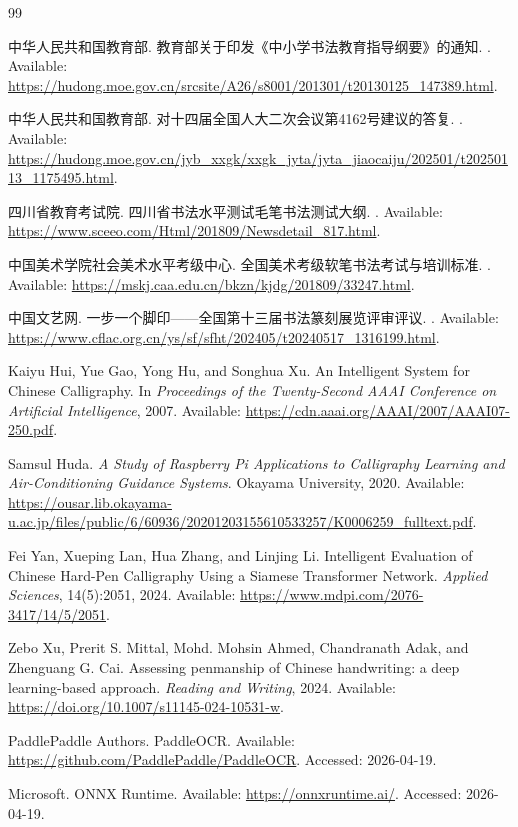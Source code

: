 \documentclass[UTF8,a4paper,12pt,fontset=none]{ctexart}
\begin{document}
\begin{thebibliography}{99}

中华人民共和国教育部.
\newblock 教育部关于印发《中小学书法教育指导纲要》的通知.
.
\newblock Available: \url{https://hudong.moe.gov.cn/srcsite/A26/s8001/201301/t20130125_147389.html}.

中华人民共和国教育部.
\newblock 对十四届全国人大二次会议第4162号建议的答复.
.
\newblock Available: \url{https://hudong.moe.gov.cn/jyb_xxgk/xxgk_jyta/jyta_jiaocaiju/202501/t20250113_1175495.html}.

四川省教育考试院.
\newblock 四川省书法水平测试毛笔书法测试大纲.
.
\newblock Available: \url{https://www.sceeo.com/Html/201809/Newsdetail_817.html}.

中国美术学院社会美术水平考级中心.
\newblock 全国美术考级软笔书法考试与培训标准.
.
\newblock Available: \url{https://mskj.caa.edu.cn/bkzn/kjdg/201809/33247.html}.

中国文艺网.
\newblock 一步一个脚印——全国第十三届书法篆刻展览评审评议.
.
\newblock Available: \url{https://www.cflac.org.cn/ys/sf/sfht/202405/t20240517_1316199.html}.

Kaiyu Hui, Yue Gao, Yong Hu, and Songhua Xu.
\newblock An Intelligent System for Chinese Calligraphy.
\newblock In \emph{Proceedings of the Twenty-Second AAAI Conference on Artificial Intelligence}, 2007.
\newblock Available: \url{https://cdn.aaai.org/AAAI/2007/AAAI07-250.pdf}.

Samsul Huda.
\newblock \emph{A Study of Raspberry Pi Applications to Calligraphy Learning and Air-Conditioning Guidance Systems}.
\newblock Okayama University, 2020.
\newblock Available: \url{https://ousar.lib.okayama-u.ac.jp/files/public/6/60936/20201203155610533257/K0006259_fulltext.pdf}.

Fei Yan, Xueping Lan, Hua Zhang, and Linjing Li.
\newblock Intelligent Evaluation of Chinese Hard-Pen Calligraphy Using a Siamese Transformer Network.
\newblock \emph{Applied Sciences}, 14(5):2051, 2024.
\newblock Available: \url{https://www.mdpi.com/2076-3417/14/5/2051}.

Zebo Xu, Prerit S. Mittal, Mohd. Mohsin Ahmed, Chandranath Adak, and Zhenguang G. Cai.
\newblock Assessing penmanship of Chinese handwriting: a deep learning-based approach.
\newblock \emph{Reading and Writing}, 2024.
\newblock Available: \url{https://doi.org/10.1007/s11145-024-10531-w}.

PaddlePaddle Authors.
\newblock PaddleOCR.
\newblock Available: \url{https://github.com/PaddlePaddle/PaddleOCR}. Accessed: 2026-04-19.

Microsoft.
\newblock ONNX Runtime.
\newblock Available: \url{https://onnxruntime.ai/}. Accessed: 2026-04-19.

\end{thebibliography}
\end{document}
